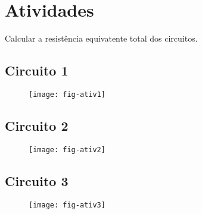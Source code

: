 \section{Atividades}

Calcular a resistência equivatente total dos circuitos.

\subsection{ Circuito 1}
\begin{figure}[H]
  \centering
  \label{fig:ativ1}
  \texttt{[image: fig-ativ1]}
\end{figure}

\subsection{ Circuito 2}
\begin{figure}[H]
  \centering
  \label{fig:ativ1}
  \texttt{[image: fig-ativ2]}
\end{figure}

\subsection{ Circuito 3}
\begin{figure}[H]
  \centering
  \label{fig:ativ1}
  \texttt{[image: fig-ativ3]}
\end{figure}
